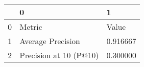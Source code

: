 \begin{tabular}{lll}
\toprule
 & 0 & 1 \\
\midrule
0 & Metric & Value \\
1 & Average Precision & 0.916667 \\
2 & Precision at 10 (P@10) & 0.300000 \\
\bottomrule
\end{tabular}
